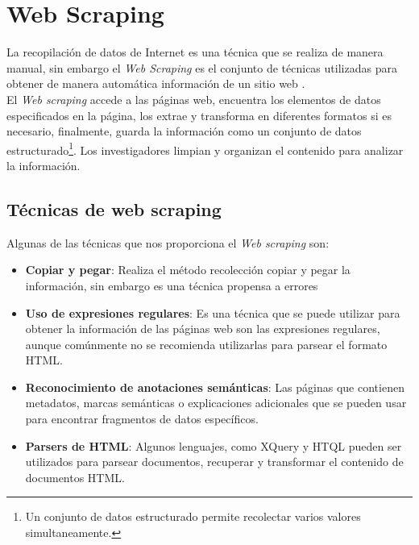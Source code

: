 


\section{Web Scraping}

La recopilación de datos de Internet es una técnica que se realiza de manera manual, sin embargo 
el \textit{Web Scraping} es el conjunto de técnicas utilizadas para obtener de manera automática información de 
un sitio web \citep{CTWebScraping}. 
\\
El \textit{Web scraping} accede a las páginas web, encuentra los elementos de datos especificados en la 
página, los extrae y transforma en diferentes formatos si es necesario, finalmente, guarda 
la información como un conjunto de datos estructurado\footnote{Un conjunto de datos estructurado permite recolectar 
varios valores simultaneamente.}. Los investigadores limpian y organizan el contenido para analizar la información.


\subsection{Técnicas de web scraping}

Algunas de las técnicas que nos proporciona el \textit{Web scraping} son\citep{CTTechniques}:

\begin{itemize}

    \item \textbf{Copiar y pegar}: Realiza el método recolección copiar y pegar la información, 
    sin embargo es una técnica propensa a errores

    \item \textbf{Uso de expresiones regulares}: Es una técnica que se puede utilizar para obtener la información 
    de las páginas web son las expresiones regulares, aunque comúnmente no se recomienda utilizarlas para parsear el formato HTML.

    \item \textbf{Reconocimiento de anotaciones semánticas}: Las páginas que contienen metadatos, 
    marcas semánticas o explicaciones adicionales que se pueden usar para encontrar fragmentos de datos específicos.

    \item \textbf{Parsers de HTML}: Algunos lenguajes, como XQuery y HTQL pueden ser utilizados para parsear documentos, recuperar 
    y transformar el contenido de documentos HTML.

\end{itemize}

